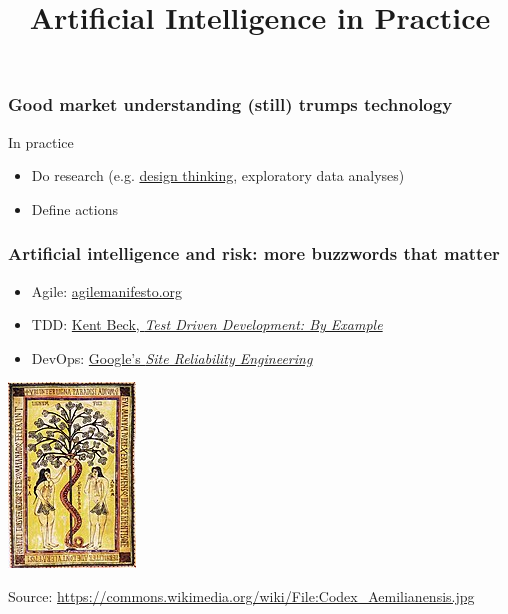 

\title{Artificial Intelligence in Practice}

\maketitle


\begin{frame}
\frametitle{Good market understanding (still) trumps technology}
    \centering
{}

  In practice
  \begin{itemize}
    \item Do research (e.g. \href{https://en.wikipedia.org/wiki/Design\_thinking}{design thinking}, exploratory data analyses)
    \item Define actions
  \end{itemize}
\end{frame}


\begin{frame}
\frametitle{Artificial intelligence and risk: more buzzwords that matter}
\begin{itemize}
\item Agile: \href{https://agilemanifesto.org/}{agilemanifesto.org}
\item TDD: \href{https://www.oreilly.com/library/view/test-driven-development/0321146530/}{Kent Beck, {\it Test Driven Development: By Example}}
\item DevOps: \href{https://landing.google.com/sre/books/}{Google's {\it Site Reliability Engineering}}
\end{itemize}
\begin{center}
\includegraphics[height=0.35\textheight]{graphics/Codex_Aemilianensis}
\end{center}
Source: \url{https://commons.wikimedia.org/wiki/File:Codex_Aemilianensis.jpg}
\end{frame}


